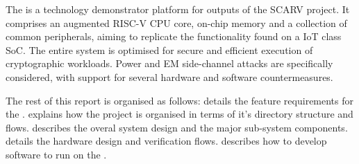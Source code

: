
The \SCARVSOC is a technology demonstrator platform for outputs of the 
SCARV project.
It comprises an augmented RISC-V CPU core, on-chip memory and a
collection of common peripherals, aiming to replicate the functionality
found on a IoT class SoC.
The entire system is optimised for secure and efficient execution of
cryptographic workloads.
Power and EM side-channel attacks are specifically considered,
with support for several hardware and software countermeasures.

The rest of this report is organised as follows:
 details the feature requirements for
the \SCARVSOC.
 explains how the project is organised in terms
of it's directory structure and flows.
 describes the overal system design and the major
sub-system components.
 details the hardware design and verification flows.
 describes how to develop software to run on
the \SCARVSOC.
